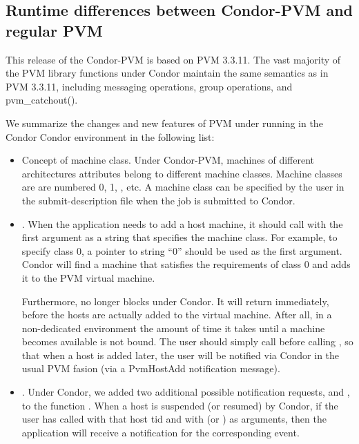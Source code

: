\subsection{Runtime differences between Condor-PVM and regular PVM}

This release of the Condor-PVM is based on PVM 3.3.11.  The vast majority of the PVM
library functions under Condor maintain the same semantics as in
PVM 3.3.11, including messaging operations, group operations, and 
pvm\_catchout().

We summarize the changes and new features of PVM under running in the Condor 
Condor environment in the following list:

\begin{itemize}

\item Concept of machine class.  Under Condor-PVM, machines of
  different architectures attributes belong to different machine classes.  Machine
  classes are are numbered 0, 1, \Dots, etc.  A machine class can be
  specified by the user in the submit-description file when the job
  is submitted to Condor.

\item {}.  When the application
  needs to add a host machine, it should call 
  with the first argument as a string that specifies the machine
  class.  For example, to specify class 0, a pointer to string ``0''
  should be used as the first argument.  Condor will find a machine
  that satisfies the requirements of class 0 and adds it to the PVM
  virtual machine.

  Furthermore,  no longer blocks under Condor.  It
  will return immediately, before the hosts are actually added to the virtual
  machine.  After all, in a non-dedicated environment the amount of time it takes until
  a machine becomes available is not bound. The user should simply call 
   before calling
  , so that when a host is added later, the user
  will be notified via Condor in the usual PVM 
  fasion (via a PvmHostAdd notification message).
    
\item {}.  Under Condor, we added two additional 
  possible notification requests,  and
  , to the function .  When a
  host is suspended (or resumed) by Condor, if the user has called
   with that host tid and with
   (or ) as arguments, then
  the application will receive a notification for the corresponding
  event.


\end{itemize}
